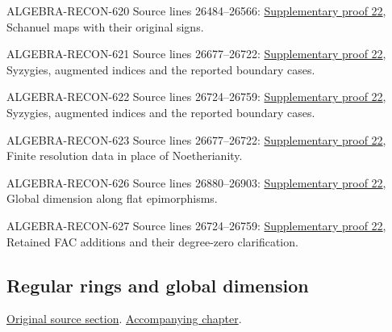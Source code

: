 \begin{AlgebraSourceRoutes}
\item[ALGEBRA-RECON-620] Source lines 26484--26566: \hyperlink{algebra_pure_global_notes_20260928}{Supplementary proof 22}, Schanuel maps with their original signs.
\item[ALGEBRA-RECON-621] Source lines 26677--26722: \hyperlink{algebra_pure_global_notes_20260928}{Supplementary proof 22}, Syzygies, augmented indices and the reported boundary cases.
\item[ALGEBRA-RECON-622] Source lines 26724--26759: \hyperlink{algebra_pure_global_notes_20260928}{Supplementary proof 22}, Syzygies, augmented indices and the reported boundary cases.
\item[ALGEBRA-RECON-623] Source lines 26677--26722: \hyperlink{algebra_pure_global_notes_20260928}{Supplementary proof 22}, Finite resolution data in place of Noetherianity.
\item[ALGEBRA-RECON-626] Source lines 26880--26903: \hyperlink{algebra_pure_global_notes_20260928}{Supplementary proof 22}, Global dimension along flat epimorphisms.
\item[ALGEBRA-RECON-627] Source lines 26724--26759: \hyperlink{algebra_pure_global_notes_20260928}{Supplementary proof 22}, Retained FAC additions and their degree-zero clarification.
\end{AlgebraSourceRoutes}

\subsection{Regular rings and global dimension}
\hypertarget{algebra-source-section-regular-finite-gl-dim}{}
\noindent\href{https://github.com/stacks/stacks-project/blob/a04446e57ec1fbc252a871afcec7752fb2807b14/algebra.tex\#L26914}{Original source section}. \href{algebra.pdf\#nameddest=section-regular-finite-gl-dim}{Accompanying chapter}.

